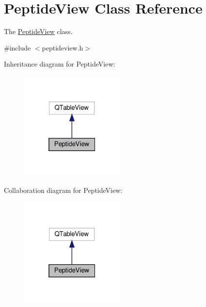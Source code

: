 \hypertarget{class_peptide_view}{}\section{Peptide\+View Class Reference}
\label{class_peptide_view}


The \mbox{\hyperlink{class_peptide_view}{Peptide\+View}} class.  




{\ttfamily \#include $<$peptideview.\+h$>$}



Inheritance diagram for Peptide\+View\+:\nopagebreak
\begin{figure}[H]
\begin{center}
\leavevmode
\includegraphics[width=151pt]{class_peptide_view__inherit__graph}
\end{center}
\end{figure}


Collaboration diagram for Peptide\+View\+:\nopagebreak
\begin{figure}[H]
\begin{center}
\leavevmode
\includegraphics[width=151pt]{class_peptide_view__coll__graph}
\end{center}
\end{figure}
